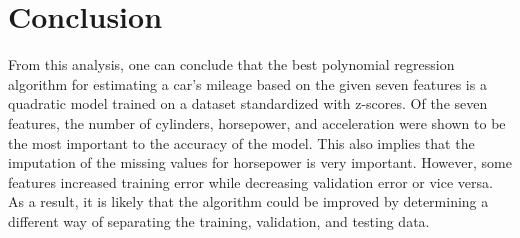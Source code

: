 \documentclass[12pt]{article}
\begin{document}
	\section{Conclusion} \label{conclusion}
    
	From this analysis, one can conclude that the best polynomial regression algorithm for estimating a car's mileage based on the given seven features is a quadratic model trained on a dataset standardized with z-scores. Of the seven features, the number of cylinders, horsepower, and acceleration were shown to be the most important to the accuracy of the model. This also implies that the imputation of the missing values for horsepower is very important. However, some features increased training error while decreasing validation error or vice versa. As a result, it is likely that the algorithm could be improved by determining a different way of separating the training, validation, and testing data.
	
\end{document}
